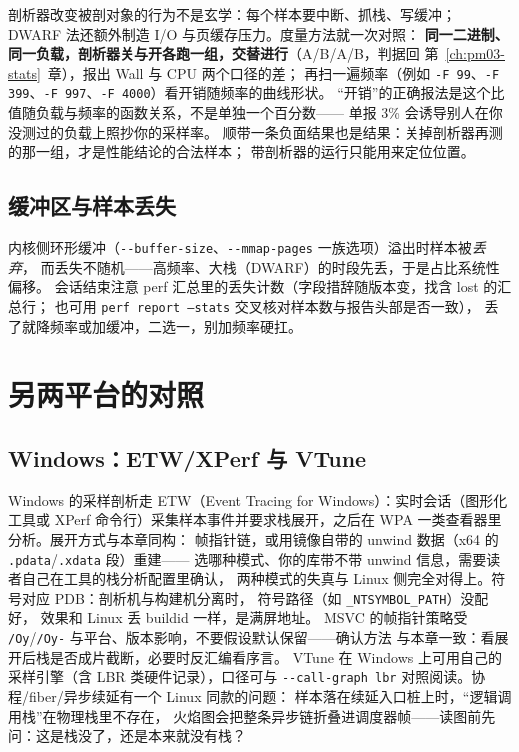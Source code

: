 \documentclass[12pt,a4paper,fontset=fandol]{ctexbook}
\newcommand{\Tp}[1]{\texttt{#1}}
\newcommand{\Opt}[1]{\texttt{-\/-#1}}
\newcommand{\Bk}{\discretionary{}{}{}}
\newcommand{\Lang}[1]{\textsf{#1}}
\newcommand{\MWall}{\Lang{Wall}}
\newcommand{\MCpu}{\Lang{CPU}}
\begin{document}
剖析器改变被剖对象的行为不是玄学：每个样本要中断、抓栈、写缓冲；
DWARF 法还额外制造 I/O 与页缓存压力。度量方法就一次对照：
\textbf{同一二进制、同一负载，剖析器关与开各跑一组，交替进行}（A/B/A/B，判据回
第~\ref{ch:pm03-stats}~章），报出 \MWall{} 与 \MCpu{} 两个口径的差；
再扫一遍频率（例如 \Tp{-F 99}、\Tp{-F 399}、\Tp{-F 997}、\Tp{-F 4000}）看开销随频率的曲线形状。
``开销''的正确报法是这个比值随负载与频率的函数关系，不是单独一个百分数——
单报 3\% 会诱导别人在你没测过的负载上照抄你的采样率。
顺带一条负面结果也是结果：关掉剖析器再测的那一组，才是性能结论的合法样本；
带剖析器的运行只能用来定位位置。

\subsection{缓冲区与样本丢失}

内核侧环形缓冲（\Opt{buffer-size}、\Opt{mmap-pages} 一族选项）溢出时样本被\emph{丢弃}，
而丢失不随机——高频率、大栈（DWARF）的时段先丢，于是占比系统性偏移。
会话结束注意 perf 汇总里的丢失计数（字段措辞随版本变，找含 lost 的汇总行；
也可用 \Tp{perf report --stats} 交叉核对样本数与报告头部是否一致），
丢了就降频率或加缓冲，二选一，别加频率硬扛。

\section{另两平台的对照}
\label{sec:pm04-other-platforms}

\subsection{Windows：ETW/XPerf 与 VTune}

Windows 的采样剖析走 ETW（Event Tracing for Windows）：实时会话（图形化工具或
XPerf 命令行）采集样本事件并要求栈展开，之后在 WPA 一类查看器里分析。展开方式与本章同构：
帧指针链，或用镜像自带的 unwind 数据（x64 的 \Tp{.pdata}/\Tp{.xdata} 段）重建——
选哪种模式、你的库带不带 unwind 信息，需要读者自己在工具的栈分析配置里确认，
两种模式的失真与 Linux 侧完全对得上。符号对应 PDB：剖析机与构建机分离时，
符号路径（如 \Tp{{\Bk}\_NT{\Bk}SYMBOL{\Bk}\_PATH}）没配好，
效果和 Linux 丢 buildid 一样，是满屏地址。
MSVC 的帧指针策略受 \Tp{/Oy}/\Tp{/Oy-} 与平台、版本影响，不要假设默认保留——确认方法
与本章一致：看展开后栈是否成片截断，必要时反汇编看序言。
VTune 在 Windows 上可用自己的采样引擎（含 LBR 类硬件记录），口径可与
\Opt{call-graph lbr} 对照阅读。协程/fiber/异步续延有一个 Linux 同款的问题：
样本落在续延入口桩上时，``逻辑调用栈''在物理栈里不存在，
火焰图会把整条异步链折叠进调度器帧——读图前先问：这是栈没了，还是本来就没有栈？
\end{document}
